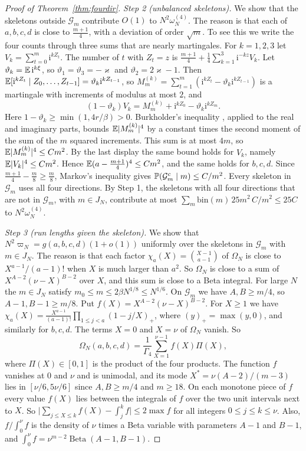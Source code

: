 \begin{proof}[Proof of Theorem~\ref{thm:fourdir}]
\emph{Step 2 (unbalanced skeletons).} We show that the skeletons outside $\mathcal G_m$ contribute
$O(1)$ to $N^2\omega^{(4)}_N$. The reason is that each of $a,b,c,d$ is close to $\frac{m+1}4$, with a
deviation of order $\sqrt m$. To see this we write the four counts through three sums that are
nearly martingales. For $k=1,2,3$ let $V_k=\sum_{t=0}^m\mathrm i^{kZ_t}$. The
number of $t$ with $Z_t=z$ is $\frac{m+1}4+\frac14\sum_{k=1}^3\mathrm i^{-kz}V_k$. Let
$\vartheta_k=\mathbb{E}\,\mathrm i^{k\xi}$, so $\vartheta_1=\vartheta_3=-\varkappa$ and
$\vartheta_2=2\varkappa-1$. Then
$\mathbb{E}[\mathrm i^{kZ_t}\mid Z_0,\dots,Z_{t-1}]=\vartheta_k\mathrm i^{kZ_{t-1}}$, so
$M^{(k)}_m=\sum_{t=1}^m(\mathrm i^{kZ_t}-\vartheta_k\mathrm i^{kZ_{t-1}})$ is a martingale with
increments of modulus at most $2$, and
\[
 (1-\vartheta_k)V_k=M^{(k)}_m+\mathrm i^{kZ_0}-\vartheta_k\mathrm i^{kZ_m}.
\]
Here $1-\vartheta_k\ge\min(1,4r/\beta)>0$. Burkholder's inequality \cite[Theorem~2.10]{hallheyde1980},
applied to the real and imaginary parts, bounds $\mathbb{E}\lvert M^{(k)}_m\rvert^4$ by a constant times
the second moment of the sum of the $m$ squared increments. This sum is at most $4m$, so
$\mathbb{E}\lvert M^{(k)}_m\rvert^4\le Cm^2$. By the last display the same bound holds for $V_k$, namely
$\mathbb{E}\lvert V_k\rvert^4\le Cm^2$. Hence $\mathbb{E}(a-\frac{m+1}4)^4\le Cm^2$, and the same holds for $b,c,d$.
Since $\frac{m+1}4-\frac m8\ge\frac m8$, Markov's inequality gives
$\mathbb{P}(\mathcal G_m^c\mid m)\le C/m^2$. Every skeleton in $\mathcal G_m$ uses all four directions. By
Step 1, the skeletons with all four directions that are not in $\mathcal G_m$, with $m\in J_N$,
contribute at most $\sum_m\mathrm{bin}(m)\,25m^2\,C/m^2\le25C$ to $N^2\omega^{(4)}_N$.

\emph{Step 3 (run lengths given the skeleton).} We show that $N^2\varpi_N=g(a,b,c,d)(1+o(1))$
uniformly over the skeletons in $\mathcal G_m$ with $m\in J_N$. The reason is that each
factor $\chi_a(X)=\binom{X-1}{a-1}$ of $\Omega_N$ is close to $X^{a-1}/(a-1)!$ when $X$ is much
larger than $a^2$. So $\Omega_N$ is close to a sum of $X^{A-2}(\nu-X)^{B-2}$ over $X$, and this sum
is close to a Beta integral. For large $N$ the $m\in J_N$ satisfy
$m_0\le m\le2\beta N^{1/8}\le N^{1/6}$. On $\mathcal G_m$ we have $A,B\ge m/4$, so
$A-1,B-1\ge m/8$. Put $f(X)=X^{A-2}(\nu-X)^{B-2}$. For
$X\ge1$ we have $\chi_a(X)=\frac{X^{a-1}}{(a-1)!}\prod_{1\le j<a}(1-j/X)_+$, where
$(y)_+=\max(y,0)$, and similarly for $b,c,d$. The terms $X=0$ and $X=\nu$ of $\Omega_N$ vanish. So
\[
 \Omega_N(a,b,c,d)=\frac1{\Gamma_4}\sum_{X=1}^{\nu-1}f(X)\Pi(X),
\]
where $\Pi(X)\in[0,1]$ is the product of the four products. The function $f$ vanishes at $0$ and
$\nu$ and is unimodal, and its mode $X^*=\nu(A-2)/(m-3)$ lies in $[\nu/6,5\nu/6]$ since
$A,B\ge m/4$ and $m\ge18$. On each monotone piece of $f$ every value $f(X)$ lies between the
integrals of $f$ over the two unit intervals next to $X$. So $\lvert\sum_{j\le X\le k}f(X)-\int_j^kf\rvert\le2\max f$ for all integers
$0\le j\le k\le\nu$. Also, $f/\int_0^\nu f$ is the density of $\nu$ times a Beta variable with
parameters $A-1$ and $B-1$, and $\int_0^\nu f=\nu^{m-2}\operatorname{Beta}(A-1,B-1)$.


\end{proof}
